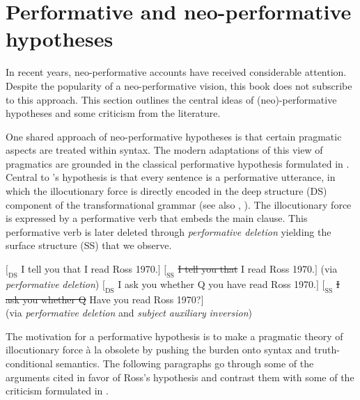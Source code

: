 \section{Performative and neo-performative hypotheses}\label{sec:performativehyp}

In recent years, neo-performative accounts have   received considerable attention.  Despite the popularity of a neo-performative vision, this book does not subscribe to this approach.  This section outlines the central ideas of (neo)-performative hypotheses and some criticism from the literature.  

One shared approach of neo-performative hypotheses is that certain pragmatic aspects  are treated within syntax. The modern adaptations of this view of pragmatics are grounded in the classical performative hypothesis formulated in \citet{Ross1970}. Central to \citeauthor{Ross1970}’s hypothesis is that every sentence is a performative utterance,
 in which the illocutionary force is directly encoded in the deep structure (DS) component of the transformational grammar (see also \citealt{Katz1963}, \citealt{Sadock1969, Sadock1974}). The illocutionary force is expressed
by a performative verb that embeds the main clause. This performative verb is later deleted through \emph{performative deletion} yielding the surface structure (SS) that we observe.

\ea	
	\ea $[_{\text{DS}}$ I tell you that I read Ross 1970.$]$
\ex  $[_{\text{SS}}$ \sout{I tell you that} I read Ross 1970.$]$ (via \emph{performative} \emph{deletion})
\z
\z
\ea
	\ea$[_{\text{DS}}$ I ask you whether Q you have read Ross 1970.$]$
		\ex  $[_{\text{SS}}$ \sout{I ask you whether Q } Have you  read Ross 1970?$]$ \\(via \emph{performative} \emph{deletion} and \emph{subject} \emph{auxiliary} \emph{inversion})
	\z
\z

The motivation for a performative hypothesis is to make  a pragmatic theory of illocutionary force à la \citet{Austin1961} obsolete by pushing the burden onto syntax and truth-conditional semantics. The following paragraphs go through some of the arguments cited in favor of Ross’s hypothesis and contrast them with some of the criticism
formulated in \citet[246--276]{Levinson1983}. 

